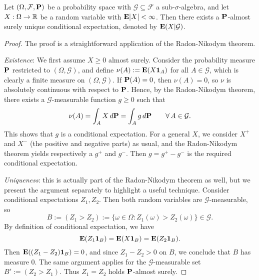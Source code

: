 \begin{theorem}
\label{thm:cond-ex}
    Let $(\Omega,\mathcal{F},\mathbf{P})$ be a probability space with $\mathcal{G}\subseteq\mathcal{F}$ a sub-$\sigma$-algebra, and let $X:\Omega\to\mathbb{R}$ be a random variable with $\mathbf{E}|X|<\infty$. Then there exists a $\mathbf{P}$-almost surely unique conditional expectation, denoted by $\mathbf{E}(X|\mathcal{G})$.
\end{theorem}

\begin{proof}
    The proof is a straightforward application of the Radon-Nikodym theorem.

    \emph{Existence}: We first assume $X \ge 0$ almost surely. Consider the probability measure $\mathbf{P}$ restricted to $(\Omega, \mathcal{G})$, and define $\nu(A) := \mathbf{E}(X \mathbf{1}_A)$ for all $A\in\mathcal{G}$, which is clearly a finite measure on $(\Omega,\mathcal{G})$. If $\mathbf{P}(A) = 0$, then $\nu(A) = 0$, so $\nu$ is absolutely continuous with respect to $\mathbf{P}$. Hence, by the Radon-Nikodym theorem, there exists a $\mathcal{G}$-measurable function $g \ge 0$ such that
    \begin{equation*}
    \nu(A) = \int_A X\,d\mathbf{P} = \int_A g \,d\mathbf{P} \qquad\forall\, A\in\mathcal{G}.
    \end{equation*}
    This shows that $g$ is a conditional expectation. For a general $X$, we consider $X^+$ and $X^-$ (the positive and negative parts) as usual, and the Radon-Nikodym theorem yields respectively a $g^+$ and $g^-$. Then $g = g^+ - g^-$ is the required conditional expectation.

    \emph{Uniqueness}: this is actually part of the Radon-Nikodym theorem as well, but we present the argument separately to highlight a useful technique. Consider conditional expectations $Z_1, Z_2$. Then both random variables are $\mathcal{G}$-measurable, so
    \begin{equation*}
        B := (Z_1>Z_2) := \{\omega\in\Omega : Z_1(\omega) > Z_2(\omega)\}\in\mathcal{G}.
    \end{equation*}
    By definition of conditional expectation, we have
    \begin{equation*}
    \mathbf{E}(Z_1\mathbf{1}_B) = \mathbf{E}(X\mathbf{1}_B) = \mathbf{E}(Z_2\mathbf{1}_B).
    \end{equation*}
    Then $\mathbf{E}((Z_1 - Z_2)\mathbf{1}_{B}) = 0$, and since $Z_1 - Z_2 > 0$ on $B$, we conclude that $B$ has measure 0. The same argument applies for the $\mathcal{G}$-measurable set $B' := (Z_2>Z_1)$. Thus $Z_1 = Z_2$ holds $\mathbf{P}$-almost surely.
\end{proof}

